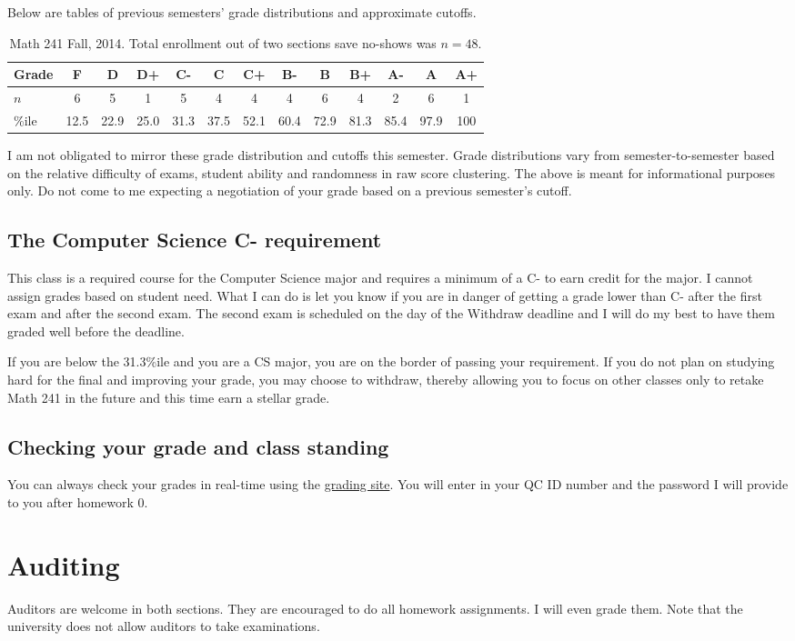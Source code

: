 \documentclass[12pt]{article}
\begin{document}
\noindent Below are tables of previous semesters' grade distributions and approximate cutoffs.

\begin{table}[h]
\centering
\begin{tabular}{l|cccccccccccc}
Grade & F & D & D+ & C- & C & C+ & B- & B & B+ & A- & A & A+ \\ \hline
$n$ & 6 & 5 & 1 & 5 & 4 & 4 & 4 & 6 & 4 & 2 & 6 & 1 \\
\%ile & 12.5 & 22.9 &  25.0 & 31.3 & 37.5 & 52.1 & 60.4 & 72.9 & 81.3 &  85.4 & 97.9 & 100 \\ \hline
\end{tabular}
\caption{Math 241 Fall, 2014. Total enrollment out of two sections save no-shows was $n=48$.}
\end{table}

I am not obligated to mirror these grade distribution and cutoffs this semester. Grade distributions vary from semester-to-semester based on the relative difficulty of exams, student ability and randomness in raw score clustering. The above is meant for informational purposes only. Do not come to me expecting a negotiation of your grade based on a previous semester's cutoff.



\subsection*{The Computer Science C- requirement}

This class is a required course for the Computer Science major and requires a minimum of a C- to earn credit for the major. I cannot assign grades based on student need. What I can do is let you know if you are in danger of getting a grade lower than C- after the first exam and after the second exam. The second exam is scheduled on the day of the Withdraw deadline and I will do my best to have them graded well before the deadline. 

If you are below the 31.3\%ile and you are a CS major, you are on the border of passing your requirement. If you do not plan on studying hard for the final and improving your grade, you may choose to withdraw, thereby allowing you to focus on other classes only to retake Math 241 in the future and this time earn a stellar grade.

\subsection*{Checking your grade and class standing}

You can always check your grades in real-time using the \href{http://qcgrades.com}{grading site}. You will enter in your QC ID number and the password I will provide to you after homework 0.



\section*{Auditing}

Auditors are welcome in both sections. They are encouraged to do all homework assignments. I will even grade them. Note that the university does not allow auditors to take examinations.
\end{document}
